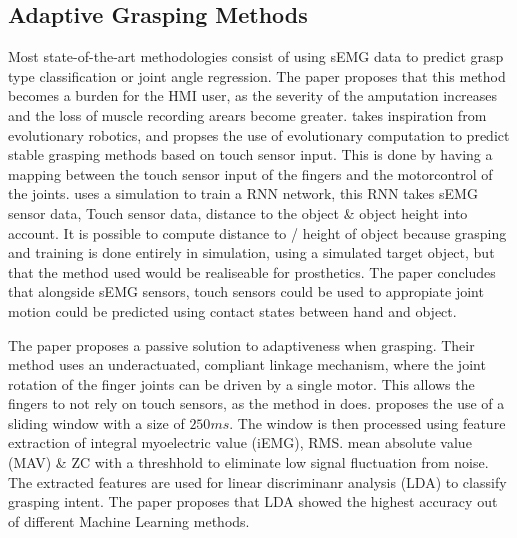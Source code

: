 \documentclass[../main.tex]{subfiles}
\begin{document}
\subsection{Adaptive Grasping Methods}
Most state-of-the-art methodologies consist of using sEMG data to predict grasp type classification or joint angle regression.
The paper \cite{Yuki2023} proposes that this method becomes a burden for the HMI user, as the severity of the amputation increases and the loss of muscle recording arears become greater.
\cite{Yuki2023} takes inspiration from evolutionary robotics, and propses the use of evolutionary computation to predict stable grasping methods based on touch sensor input.
This is done by having a mapping between the touch sensor input of the fingers and the motorcontrol of the joints.
\cite{Yuki2023} uses a simulation to train a RNN network, this RNN takes sEMG sensor data, Touch sensor data, distance to the object \& object height into account.
It is possible to compute distance to / height of object because grasping and training is done entirely in simulation, using a simulated target object, but that the method used would be realiseable for prosthetics. 
The paper concludes that alongside sEMG sensors, touch sensors could be used to appropiate joint motion could be predicted using contact states between hand and object.

The paper \cite{YanchaoWang2022} proposes a passive solution to adaptiveness when grasping.
Their method uses an underactuated, compliant linkage mechanism, where the joint rotation of the finger joints can be driven by a single motor.
This allows the fingers to not rely on touch sensors, as the method in \cite{Yuki2023} does.
\cite{YanchaoWang2022} proposes the use of a sliding window with a size of $250ms$.
The window is then processed using feature extraction of integral myoelectric value (iEMG), RMS. mean absolute value (MAV) \& ZC with a threshhold to eliminate low signal fluctuation from noise.
The extracted features are used for linear discriminanr analysis (LDA) to classify grasping intent. 
The paper proposes that LDA showed the highest accuracy out of different Machine Learning methods.
\end{document}
